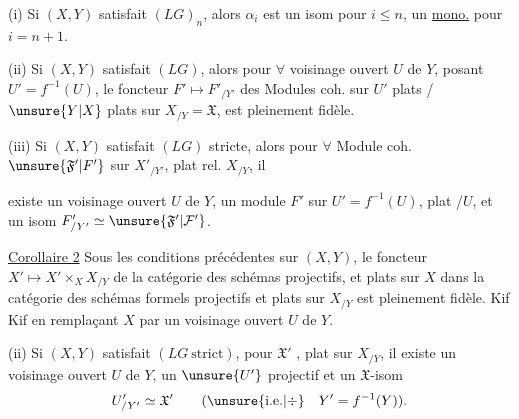 
(i) Si $(X,Y)$ satisfait $(LG)_n$, alors
$\alpha_i$ est un isom pour $i\leq n$, un \uline{mono.}
pour $i=n+1$.

(ii) Si $(X,Y)$ satisfait $(LG)$, alors pour
$\forall$ voisinage ouvert $U$ de $Y$, posant $U'=f^{-1}(U)$,
 le foncteur
$F'\longmapsto F'_{/Y'}$
des Modules coh. sur $U'$ plats /$\unsure{Y|X}$
plats sur $X_{/Y}=\mathfrak X$,
est pleinement fidèle.


(iii) Si $(X,Y)$ satisfait $(LG)$ stricte, alors pour
$\forall$ Module coh. $\unsure{\mathfrak F'|F'}$ sur $X'_{/Y'}$, plat rel. $X_{/Y}$, il


existe un voisinage ouvert $U$ de $Y$, 
un module $F'$ sur $U'=f^{-1}(U)$, plat /$U$, et un
isom $F'_{/Y'}\simeq\unsure{\mathfrak F'|\mathcal F'}$.

\uline{Corollaire 2} Sous les conditions précédentes sur
$(X,Y)$, 
le foncteur $X'\longmapsto X'\times_X X_{/Y}$
de la catégorie des schémas  projectifs,
et plats sur $X$ dans la catégorie des
schémas formels projectifs et plats sur $X_{/Y}$
est pleinement fidèle. Kif Kif en
remplaçant $X$ par un voisinage ouvert $U$ de $Y$.


(ii) Si $(X,Y)$ satisfait $(LG\ \text{strict})$, pour
 $\mathfrak X'$ 
, plat sur $X_{/Y}$, il existe
un voisinage ouvert $U$ de $Y$,  un
$\unsure{U'}$ projectif 
 et un
$\mathfrak X$-isom
\[
U'_{/Y'}\simeq\mathfrak X'\qquad (\unsure{\text{i.e.}|\div}\quad Y'=f^{-1}(Y)).
\]

